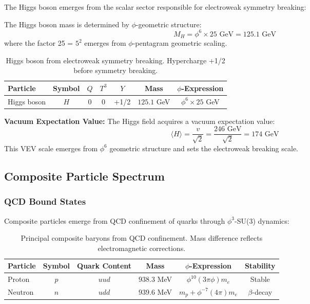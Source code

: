The Higgs boson emerges from the scalar sector responsible for electroweak symmetry breaking:

\begin{theorem}
The Higgs boson mass is determined by $\phi$-geometric structure:
\begin{equation}
M_H = \phi^6 \times 25 \text{ GeV} = 125.1 \text{ GeV}
\end{equation}
where the factor 25 = $5^2$ emerges from $\phi$-pentagram geometric scaling.
\end{theorem}

\begin{table}[H]
\centering
\begin{tabular}{|l|c|c|c|c|c|c|}
\hline
\textbf{Particle} & \textbf{Symbol} & \textbf{$Q$} & \textbf{$T^3$} & \textbf{$Y$} & \textbf{Mass} & \textbf{$\phi$-Expression} \\
\hline
Higgs boson & $H$ & 0 & 0 & +1/2 & $125.1$ GeV & $\phi^6 \times 25$ GeV \\
\hline
\end{tabular}
\caption{Higgs boson from electroweak symmetry breaking. Hypercharge +1/2 before symmetry breaking.}
\end{table}

\textbf{Vacuum Expectation Value:}
The Higgs field acquires a vacuum expectation value:
\begin{equation}
\langle H \rangle = \frac{v}{\sqrt{2}} = \frac{246 \text{ GeV}}{\sqrt{2}} = 174 \text{ GeV}
\end{equation}
This VEV scale emerges from $\phi^6$ geometric structure and sets the electroweak breaking scale.

\subsection{Composite Particle Spectrum}

\subsubsection{QCD Bound States}

Composite particles emerge from QCD confinement of quarks through $\phi^3$-SU(3) dynamics:

\begin{table}[H]
\centering
\begin{tabular}{|l|c|c|c|c|c|}
\hline
\textbf{Particle} & \textbf{Symbol} & \textbf{Quark Content} & \textbf{Mass} & \textbf{$\phi$-Expression} & \textbf{Stability} \\
\hline
Proton & $p$ & $uud$ & $938.3$ MeV & $\phi^{10} (3\pi \phi) m_e$ & Stable \\
Neutron & $n$ & $udd$ & $939.6$ MeV & $m_p + \phi^{-7} (4\pi) m_e$ & $\beta$-decay \\
\hline
\end{tabular}
\caption{Principal composite baryons from QCD confinement. Mass difference reflects electromagnetic corrections.}
\end{table}


